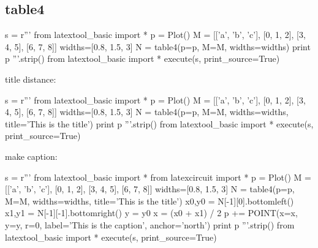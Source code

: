 \subsection{table4}

\begin{python}
s = r'''
from latextool_basic import *
p = Plot()
M = [['a', 'b', 'c'],
     [0, 1, 2],
     [3, 4, 5],
     [6, 7, 8]]
widths=[0.8, 1.5, 3]
N = table4(p=p, M=M, widths=widths)
print p
'''.strip()
from latextool_basic import *
execute(s, print_source=True)
\end{python}

\newpage
title distance:
\begin{python}
s = r'''
from latextool_basic import *
p = Plot()
M = [['a', 'b', 'c'],
     [0, 1, 2],
     [3, 4, 5],
     [6, 7, 8]]
widths=[0.8, 1.5, 3]
N = table4(p=p, M=M, widths=widths, title='This is the title')
print p
'''.strip()
from latextool_basic import *
execute(s, print_source=True)
\end{python}


\newpage
make caption:
\begin{python}
s = r'''
from latextool_basic import *
from latexcircuit import *
p = Plot()
M = [['a', 'b', 'c'],
     [0, 1, 2],
     [3, 4, 5],
     [6, 7, 8]]
widths=[0.8, 1.5, 3]
N = table4(p=p, M=M, widths=widths, title='This is the title')
x0,y0 = N[-1][0].bottomleft()
x1,y1 = N[-1][-1].bottomright()
y = y0
x = (x0 + x1) / 2
p += POINT(x=x, y=y, r=0, label='This is the caption', anchor='north')
print p
'''.strip()
from latextool_basic import *
execute(s, print_source=True)
\end{python}


